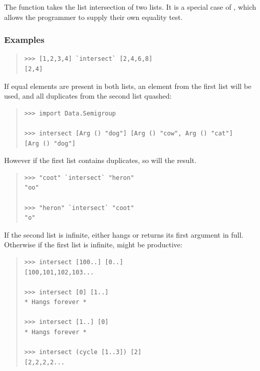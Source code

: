 \begin{haddockdesc}
\item[\begin{tabular}{@{}l}
intersect :: Eq a => {\char 91}a{\char 93} -> {\char 91}a{\char 93} -> {\char 91}a{\char 93}
\end{tabular}]
{\haddockbegindoc
The  function takes the list intersection of two lists.
 It is a special case of , which allows the programmer to
 supply their own equality test.\par
\subsubsection*{\textbf{Examples}}
\begin{quote}
{\haddockverb\begin{verbatim}
>>> [1,2,3,4] `intersect` [2,4,6,8]
[2,4]

\end{verbatim}}
\end{quote}
If equal elements are present in both lists, an element from the first list
 will be used, and all duplicates from the second list quashed:\par
\begin{quote}
{\haddockverb\begin{verbatim}
>>> import Data.Semigroup

>>> intersect [Arg () "dog"] [Arg () "cow", Arg () "cat"]
[Arg () "dog"]

\end{verbatim}}
\end{quote}
However if the first list contains duplicates, so will the result.\par
\begin{quote}
{\haddockverb\begin{verbatim}
>>> "coot" `intersect` "heron"
"oo"

>>> "heron" `intersect` "coot"
"o"

\end{verbatim}}
\end{quote}
If the second list is infinite,  either hangs
 or returns its first argument in full. Otherwise if the first list
 is infinite,  might be productive:\par
\begin{quote}
{\haddockverb\begin{verbatim}
>>> intersect [100..] [0..]
[100,101,102,103...

>>> intersect [0] [1..]
* Hangs forever *

>>> intersect [1..] [0]
* Hangs forever *

>>> intersect (cycle [1..3]) [2]
[2,2,2,2...

\end{verbatim}}
\end{quote}}
\end{haddockdesc}

